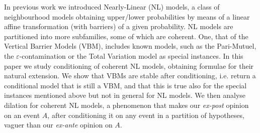 
In previous work \cite{corsato_nearly-linear_2019} we introduced Nearly-Linear (NL) models, a class of neighbourhood models obtaining upper/lower probabilities by means of a linear affine transformation (with barriers) of a given probability.
NL models are partitioned into more subfamilies, some of which are coherent.
One, that of the Vertical Barrier Models (VBM), includes known models, such as the Pari-Mutuel, the $\varepsilon$-contamination or the Total Variation model as special instances.
In this paper we study conditioning of coherent NL models, obtaining formulae for their natural extension.
We show that VBMs are stable after conditioning, i.e. return a conditional model that is still a VBM, and that this is true also for the special instances mentioned above but not in general for NL models. We then analyse dilation for coherent NL models, a phenomenon that makes our \emph{ex-post} opinion on an event $A$, after conditioning it on any event in a partition of hypotheses, vaguer than our \emph{ex-ante} opinion on $A$.


